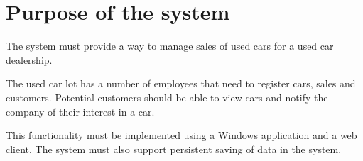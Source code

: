 \section{Purpose of the system}
The system must provide a way to manage sales of used cars for a used car dealership.

The used car lot has a number of employees that need to register cars, sales and customers. Potential customers should be able to view cars and notify the company of their interest in a car. 

This functionality must be implemented using a Windows application and a web client. The system must also support persistent saving of data in the system.